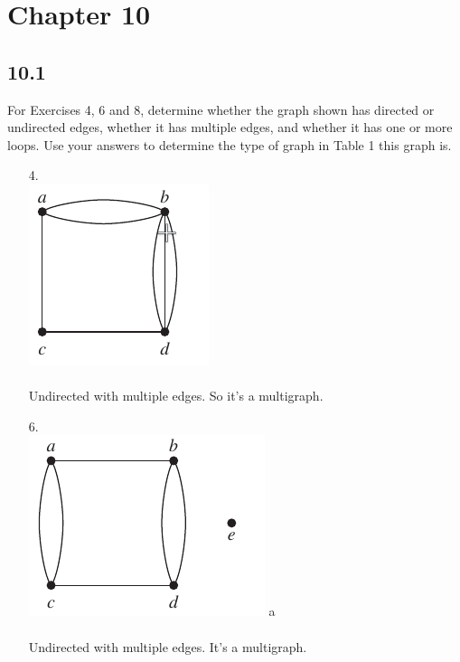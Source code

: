 \section{Chapter 10}
\subsection{10.1}
For Exercises 4, 6 and 8, determine whether the graph shown has
directed or undirected edges, whether it has multiple edges,
and whether it has one or more loops. Use your answers to
determine the type of graph in Table 1 this graph is.
\begin{itemize}
      \item[4.] \text{} \\ %
            \includegraphics[scale = 0.7]{img/10_1_4_graph.png} \\
            \answer \\
            Undirected with multiple edges. So it's a multigraph.

      \item[6.] \text{} \\
            \includegraphics[scale = 0.7]{img/10_1_6_graph.png} a\\
            \answer\\
            Undirected with multiple edges. It's a multigraph.


\end{itemize}
